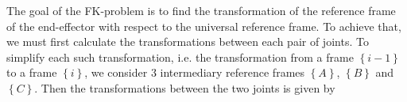 The goal of the FK-problem is to find the transformation of the reference frame of the end-effector with respect to the universal reference frame. To achieve that, we must first calculate the transformations between each pair of joints. To simplify each such transformation, i.e. the transformation from a frame $\left\lbrace i-1 \right\rbrace$ to a frame $\left\lbrace i \right\rbrace$, we consider 3 intermediary reference frames $\left\lbrace A \right\rbrace$, $\left\lbrace B \right\rbrace$ and $\left\lbrace C \right\rbrace$. Then the transformations between the two joints is given by

